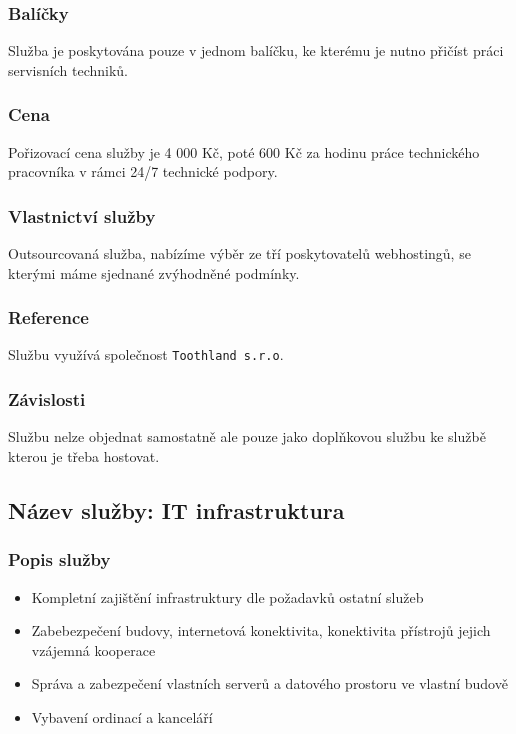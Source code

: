 \documentclass[11pt, a4paper, titlepage]{article}
\begin{document}
	\subsubsection*{Balíčky}
	Služba je poskytována pouze v jednom balíčku, ke kterému je nutno přičíst práci servisních techniků. 

	\subsubsection*{Cena}
	Pořizovací cena služby je 4 000 Kč, poté 600 Kč za hodinu práce technického pracovníka v rámci 24/7 technické podpory.

	\subsubsection*{Vlastnictví služby}
	Outsourcovaná služba, nabízíme výběr ze tří poskytovatelů webhostingů, se kterými máme sjednané zvýhodněné podmínky.

	\subsubsection*{Reference}
	Službu využívá společnost \texttt{Toothland s.r.o}.

	\subsubsection*{Závislosti}
	Službu nelze objednat samostatně ale pouze jako doplňkovou službu ke službě kterou je třeba hostovat.

	\subsection*{Název služby: IT infrastruktura}

	\subsubsection*{Popis služby}
	\begin{itemize}
		\item Kompletní zajištění infrastruktury dle požadavků ostatní služeb
		\item Zabebezpečení budovy, internetová konektivita, konektivita přístrojů jejich vzájemná kooperace
		\item Správa a zabezpečení vlastních serverů a datového prostoru ve vlastní budově
		\item Vybavení ordinací a kanceláří
	\end{itemize}
\end{document}
